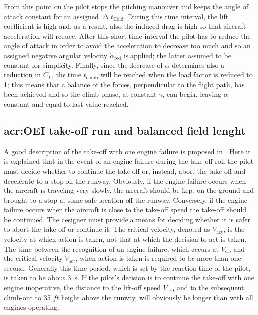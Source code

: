\bigskip
\noindent
From this point on the pilot stops the pitching manouver and keeps the angle of attack constant for an assigned $\upDelta t_{\text{Hold}}$. During this time interval, the lift coefficient is high and, as a result, also the induced drag is high so that aircraft acceleration will reduce. 
%
After this short time interval the pilot has to reduce the angle of attack in order to avoid the acceleration to decrease too much and so an assigned negative angular velocity $\dot\alpha_{\text{red}}$ is applied; the latter assumed to be constant for simplicity. 
%
Finally, since the decrease of $\alpha$ determines also a reduction in $C_L$, the time $t_{\text{climb}}$ will be reached when the load factor is reduced to 1; this means that a balance of the forces, perpendicular to the flight path, has been achieved and so the climb phase, at constant $\gamma$, can begin, leaving $\alpha$ constant and equal to last value reached. 
%
\subsection{\gls{acr:OEI} take-off run and balanced field lenght}
A good description of the take-off with one engine failure is proposed in \cite{sforza2014commercial}. Here it is explained that in the event of an engine failure during the take-off roll the pilot must decide whether to continue the take-off or, instead, abort the take-off and decelerate to a stop on the runway. Obviously, if the engine failure occurs when the aircraft is traveling very slowly, the aircraft should be kept on the ground and brought to a stop at some safe location off the runway. Conversely, if the engine failure occurs when the aircraft is close to the take-off speed the take-off should be continued. The designer must provide a means for deciding whether it is safer to abort the take-off or continue it.
%
The critical velocity, denoted as $V_{\text{act}}$, is the velocity at which action is taken, not that at which the decision to act is taken. The time between the recognition of an engine failure, which occurs at $V_{\text{ef}}$, and the critical velocity $V_{\text{act}}$, when action is taken is required to be more than one second. Generally this time period, which is set by the reaction time of the pilot, is taken to be about \SI{3}{\second}. If the pilot’s decision is to continue the take-off with one engine inoperative, the distance to the lift-off speed $V_{\text{LO}}$ and to the subsequent climb-out to 35 $\si{ft}$ height above the runway, will obviously be longer than with all engines operating.

